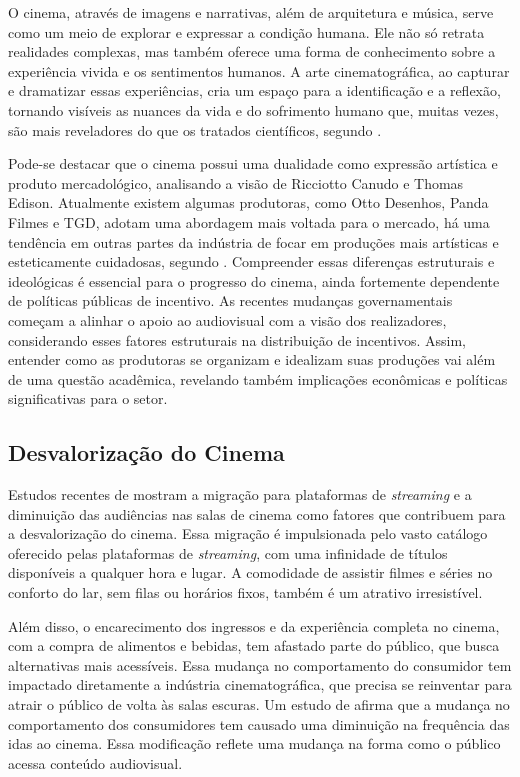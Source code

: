 \documentclass[
	article,			%
	12pt,				%
	oneside,			%
	a4paper,			%
	english,			%
	brazil,				%
	sumario=tradicional
	]{abntex2}
\begin{document}
O cinema, através de imagens e narrativas, além de arquitetura e música, serve como um meio de explorar e expressar a condição humana. Ele não só retrata realidades complexas, mas também oferece uma forma de conhecimento sobre a experiência vivida e os sentimentos humanos. A arte cinematográfica, ao capturar e dramatizar essas experiências, cria um espaço para a identificação e a reflexão, tornando visíveis as nuances da vida e do sofrimento humano que, muitas vezes, são mais reveladores do que os tratados científicos, segundo .
 
Pode-se destacar que o cinema possui uma dualidade como expressão artística e produto mercadológico, analisando a visão de Ricciotto Canudo e Thomas Edison. Atualmente existem algumas produtoras, como Otto Desenhos, Panda Filmes e TGD, adotam uma abordagem mais voltada para o mercado, há uma tendência em outras partes da indústria de focar em produções mais artísticas e esteticamente cuidadosas, segundo . Compreender essas diferenças estruturais e ideológicas é essencial para o progresso do cinema, ainda fortemente dependente de políticas públicas de incentivo. As recentes mudanças governamentais começam a alinhar o apoio ao audiovisual com a visão dos realizadores, considerando esses fatores estruturais na distribuição de incentivos. Assim, entender como as produtoras se organizam e idealizam suas produções vai além de uma questão acadêmica, revelando também implicações econômicas e políticas significativas para o setor.

\subsection{Desvalorização do Cinema}
Estudos recentes de  mostram a migração para plataformas de \textit{streaming} e a diminuição das audiências nas salas de cinema como fatores que contribuem para a desvalorização do cinema. Essa migração é impulsionada pelo vasto catálogo oferecido pelas plataformas de \textit{streaming}, com uma infinidade de títulos disponíveis a qualquer hora e lugar. A comodidade de assistir filmes e séries no conforto do lar, sem filas ou horários fixos, também é um atrativo irresistível. 

Além disso, o encarecimento dos ingressos e da experiência completa no cinema, com a compra de alimentos e bebidas, tem afastado parte do público, que busca alternativas mais acessíveis. Essa mudança no comportamento do consumidor tem impactado diretamente a indústria cinematográfica, que precisa se reinventar para atrair o público de volta às salas escuras. Um estudo de  afirma que a mudança no comportamento dos consumidores tem causado uma diminuição na frequência das idas ao cinema. Essa modificação reflete uma mudança na forma como o público acessa conteúdo audiovisual. 
\end{document}
